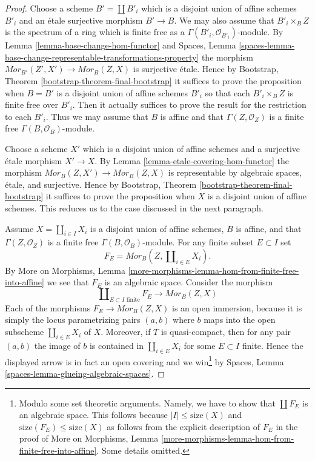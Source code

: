 \documentclass{stacks-project}
\theoremstyle{plain}
\theoremstyle{definition}
\theoremstyle{remark}
\numberwithin{equation}{subsection}
\begin{document}
\begin{proof}
Choose a scheme $B' = \coprod B'_i$ which is a disjoint union of
affine schemes $B'_i$ and an \'etale surjective morphism $B' \to B$.
We may also assume that $B'_i \times_B Z$ is the spectrum of a ring
which is finite free as a $\Gamma(B'_i, \mathcal{O}_{B'_i})$-module.
By
Lemma \ref{lemma-base-change-hom-functor}
and
Spaces, Lemma
\ref{spaces-lemma-base-change-representable-transformations-property}
the morphism $\mathit{Mor}_{B'}(Z', X') \to \mathit{Mor}_B(Z, X)$
is surjective \'etale. Hence by
Bootstrap, Theorem \ref{bootstrap-theorem-final-bootstrap}
it suffices to prove the proposition when $B = B'$ is a disjoint union of
affine schemes $B'_i$ so that each $B'_i \times_B Z$ is finite free
over $B'_i$. Then it actually suffices to prove the result for the restriction
to each $B'_i$. Thus we may assume that $B$ is affine and that
$\Gamma(Z, \mathcal{O}_Z)$ is a finite free $\Gamma(B, \mathcal{O}_B)$-module.

\medskip\noindent
Choose a scheme $X'$ which is a disjoint union of affine schemes and
a surjective \'etale morphism $X' \to X$. By
Lemma \ref{lemma-etale-covering-hom-functor}
the morphism $\mathit{Mor}_B(Z, X') \to \mathit{Mor}_B(Z, X)$
is representable by algebraic spaces, \'etale, and surjective.
Hence by
Bootstrap, Theorem \ref{bootstrap-theorem-final-bootstrap}
it suffices to prove the proposition when $X$ is a disjoint union
of affine schemes. This reduces us to the case discussed in the next
paragraph.

\medskip\noindent
Assume $X = \coprod_{i \in I} X_i$ is a disjoint union of affine
schemes, $B$ is affine, and that $\Gamma(Z, \mathcal{O}_Z)$ is a finite
free $\Gamma(B, \mathcal{O}_B)$-module. For any finite subset
$E \subset I$ set
$$
F_E = \mathit{Mor}_B(Z, \coprod\nolimits_{i \in E} X_i).
$$
By More on Morphisms,
Lemma \ref{more-morphisms-lemma-hom-from-finite-free-into-affine}
we see that $F_E$ is an algebraic space. Consider the morphism
$$
\coprod\nolimits_{E \subset I\text{ finite}} F_E
\longrightarrow
\mathit{Mor}_B(Z, X)
$$
Each of the morphisms
$F_E \to \mathit{Mor}_B(Z, X)$ is an open immersion, because it is
simply the locus parametrizing pairs $(a, b)$ where $b$ maps into
the open subscheme $\coprod\nolimits_{i \in E} X_i$ of $X$. Moreover,
if $T$ is quasi-compact, then for any pair $(a, b)$ the image
of $b$ is contained in $\coprod\nolimits_{i \in E} X_i$ for some
$E \subset I$ finite. Hence the displayed arrow is in fact an
open covering and we win\footnote{Modulo
some set theoretic arguments. Namely, we have to show that
$\coprod F_E$ is an algebraic space. This follows because
$|I| \leq \text{size}(X)$ and $\text{size}(F_E) \leq \text{size}(X)$
as follows from the explicit description of $F_E$ in the proof of
More on Morphisms,
Lemma \ref{more-morphisms-lemma-hom-from-finite-free-into-affine}.
Some details omitted.} by
Spaces, Lemma \ref{spaces-lemma-glueing-algebraic-spaces}.
\end{proof}
\end{document}

